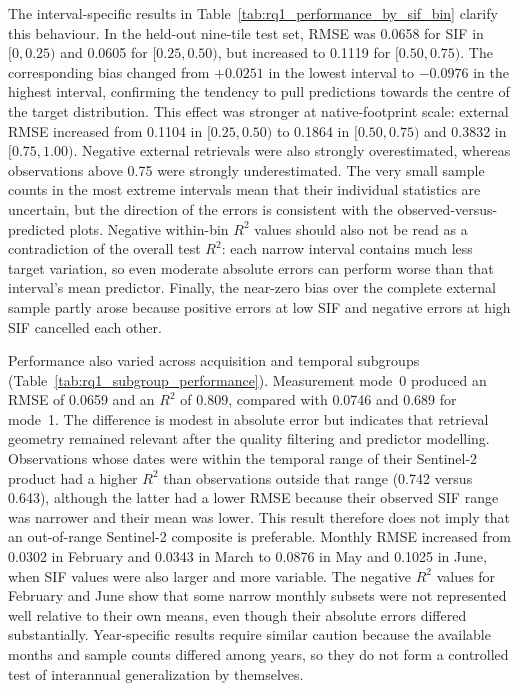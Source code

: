 The interval-specific results in Table~\ref{tab:rq1_performance_by_sif_bin} clarify this
behaviour. In the held-out nine-tile test set, RMSE was 0.0658 for SIF in $[0,0.25)$ and
0.0605 for $[0.25,0.50)$, but increased to 0.1119 for $[0.50,0.75)$. The corresponding
bias changed from $+0.0251$ in the lowest interval to $-0.0976$ in the highest interval,
confirming the tendency to pull predictions towards the centre of the target distribution.
This effect was stronger at native-footprint scale: external RMSE increased from 0.1104 in
$[0.25,0.50)$ to 0.1864 in $[0.50,0.75)$ and 0.3832 in $[0.75,1.00)$. Negative external
retrievals were also strongly overestimated, whereas observations above 0.75 were strongly
underestimated. The very small sample counts in the most extreme intervals mean that their
individual statistics are uncertain, but the direction of the errors is consistent with
the observed-versus-predicted plots. Negative within-bin $R^2$ values should also not be
read as a contradiction of the overall test $R^2$: each narrow interval contains much less
target variation, so even moderate absolute errors can perform worse than that interval's
mean predictor. Finally, the near-zero bias over the complete external sample partly arose
because positive errors at low SIF and negative errors at high SIF cancelled each other.

Performance also varied across acquisition and temporal subgroups
(Table~\ref{tab:rq1_subgroup_performance}). Measurement mode~0 produced an RMSE of 0.0659
and an $R^2$ of 0.809, compared with 0.0746 and 0.689 for mode~1. The difference is modest
in absolute error but indicates that retrieval geometry remained relevant after the quality
filtering and predictor modelling. Observations whose dates were within the temporal range
of their Sentinel-2 product had a higher $R^2$ than observations outside that range
(0.742 versus 0.643), although the latter had a lower RMSE because their observed SIF range
was narrower and their mean was lower. This result therefore does not imply that an
out-of-range Sentinel-2 composite is preferable. Monthly RMSE increased from 0.0302 in
February and 0.0343 in March to 0.0876 in May and 0.1025 in June, when SIF values were also
larger and more variable. The negative $R^2$ values for February and June show that some
narrow monthly subsets were not represented well relative to their own means, even though
their absolute errors differed substantially. Year-specific results require similar
caution because the available months and sample counts differed among years, so they do not
form a controlled test of interannual generalization by themselves.

